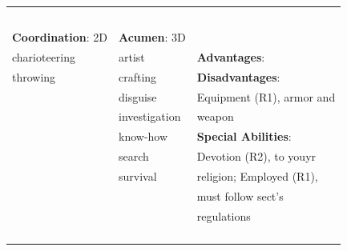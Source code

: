 \documentclass[10pt]{article}
\begin{document}
\begin{table}
\begin{tabular}{m{156pt} m{156pt} m{156pt}}
 \hrulefill &  \hrulefill & \\

 \hrulefill &  \hrulefill & \\

 \hrulefill &  \hrulefill & \\

 \hrulefill &  \hrulefill & \\

 \hrulefill &  \hrulefill & \\


\textbf{Coordination}: 2D \hrulefill & \textbf{Acumen}: 3D \hrulefill     & \hrulefill \\

charioteering        \hrulefill & artist               \hrulefill & \textbf{Advantages}: \hrulefill \\

throwing             \hrulefill & crafting             \hrulefill & \textbf{Disadvantages}: \hrulefill \\

 \hrulefill & disguise             \hrulefill & Equipment (R1), armor and \hrulefill \\

 \hrulefill & investigation        \hrulefill & weapon \hrulefill \\

 \hrulefill & know-how             \hrulefill & \textbf{Special Abilities}: \hrulefill \\

 \hrulefill & search               \hrulefill & Devotion (R2), to youyr \hrulefill \\

 \hrulefill & survival             \hrulefill & religion; Employed (R1), \hrulefill \\

 \hrulefill &  \hrulefill & must follow sect's \hrulefill \\

 \hrulefill &  \hrulefill & regulations \hrulefill \\

 \hrulefill &  \hrulefill &  \hrulefill \\

 \hrulefill &  \hrulefill &  \hrulefill \\

 \hrulefill &  \hrulefill &  \hrulefill \\

 \hrulefill &  \hrulefill &  \hrulefill \\



\end{tabular}
\end{table}
\end{document}

